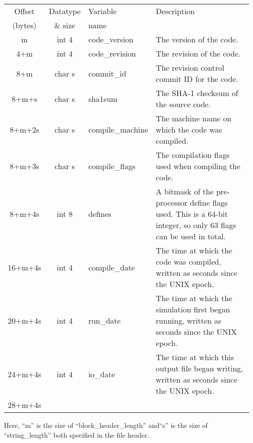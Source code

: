 \documentclass[12pt]{article}
\begin{document}
\begin{center}
\begin{tabularx}{0.9\textwidth}[!hbt]{cclX}
  Offset & Datatype & Variable & Description\\
  (bytes) & \& size & name &
  \\\toprule

  m & int 4 & code\_version & The version of the code.
  \\\midrule

  4+m & int 4 & code\_revision & The revision of the code.
  \\\midrule

  8+m & char s & commit\_id & The revision control commit ID for the code.
  \\\midrule

  8+m+s & char s & sha1sum & The SHA-1 checksum of the source code.
  \\\midrule

  8+m+2s & char s & compile\_machine & The machine name on which the code was
  compiled.
  \\\midrule

  8+m+3s & char s & compile\_flags & The compilation flags used when compiling
  the code.
  \\\midrule

  8+m+4s & int 8 & defines & A bitmask of the pre-processor define flags used.
  This is a 64-bit integer, so only 63 flags can be used in total.
  \\\midrule

  16+m+4s & int 4 & compile\_date & The time at which the code was compiled,
  written as seconds since the UNIX epoch.
  \\\midrule

  20+m+4s & int 4 & run\_date & The time at which the simulation first began
  running, written as seconds since the UNIX epoch.
  \\\midrule

  24+m+4s & int 4 & io\_date & The time at which this output file began writing,
  written as seconds since the UNIX epoch.
  \\\midrule

  28+m+4s &
\end{tabularx}
\end{center}\vspace{10pt}

Here, ``m'' is the size of ``block\_header\_length'' and``s'' is the size of
``string\_length'' both specified in the file header.
\end{document}
